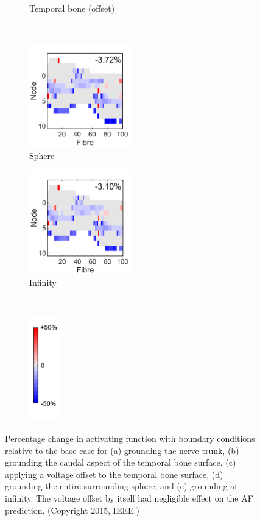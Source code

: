 \begin{figure}
\begin{subfigure}[t]{0.3\textwidth}
        \caption{Temporal bone (offset)}
        \label{fig:valid_delta_af_hemioff}
    \end{subfigure}\\%
    \vspace{0.8em}\hspace{1cm}%
    \begin{subfigure}[t]{0.3\textwidth}
        \centering
        \includegraphics[height=4.5cm]{Validation/delta_af-BC-sph}
        \caption{Sphere}
        \label{fig:valid_delta_af_sph}
    \end{subfigure}%
    \begin{subfigure}[t]{0.3\textwidth}
        \centering
        \includegraphics[height=4.5cm]{Validation/delta_af-BC-inf}
        \caption{Infinity}
        \label{fig:valid_delta_af_inf}
    \end{subfigure}%
    ~~%
    \begin{subfigure}[t]{0.09\textwidth}
        \centering
        \includegraphics[height=4.5cm]{Validation/cbar_delta_af_short}
    \end{subfigure}%
    
    \caption[Percentage change in activating function with boundary
    conditions]{Percentage change in activating function with boundary
    conditions relative to the base case for (a) grounding the nerve trunk, (b)
    grounding the caudal aspect of the temporal bone surface, (c)
    applying a voltage offset to the temporal bone surface, (d) grounding the
    entire surrounding sphere, and (e) grounding at infinity. The voltage
    offset by itself had negligible effect on the AF prediction. (Copyright
    \textcopyright{} 2015, IEEE.)}
	\label{fig:valid_delta_af_BC}
\end{figure}

